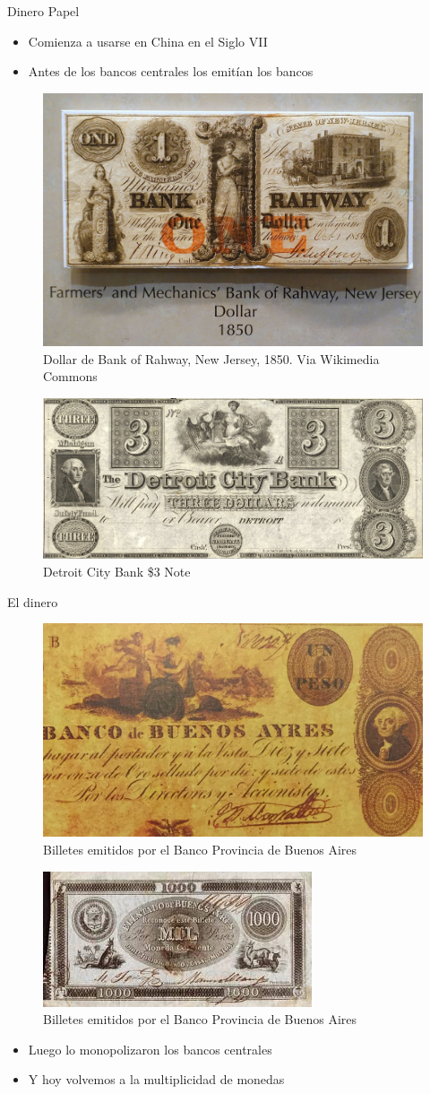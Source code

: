 \documentclass{beamer}
\begin{document}
\begin{frame}{Dinero Papel}
    \begin{itemize}
        \item Comienza a usarse en China en el Siglo VII
        \item Antes de los bancos centrales los emitían los bancos 
    \end{itemize}
\begin{figure} [H]   
    \centering
    \includegraphics[width=.35\textwidth]{../Figures/C32.2.jpg}
    \caption{Dollar de Bank of Rahway, New Jersey, 1850. Via Wikimedia Commons}
\end{figure}

\begin{figure} [H]   
    \centering
    \includegraphics[width=.35\textwidth]{../Figures/C32.3.jpeg}
    \caption{Detroit City Bank \$3 Note}
\end{figure}

\end{frame}
        
\begin{frame}{El dinero}
    \begin{figure} [H]   
    \centering
        \includegraphics[width=.35\textwidth]{../Figures/C32.4.jpg}
        \caption{Billetes emitidos por el Banco Provincia de Buenos Aires}
    \end{figure}
    \begin{figure} [H]   
        \centering\includegraphics[width=.35\textwidth]{../Figures/C32.5.jpg}
        \caption{Billetes emitidos por el Banco Provincia de Buenos Aires}
    \end{figure}
    \begin{itemize}
        \item Luego lo monopolizaron los bancos centrales
        \item Y hoy volvemos a la multiplicidad de monedas 
    \end{itemize}     
\end{frame}
\end{document}

